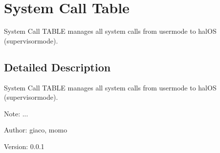 \hypertarget{group___s_y_s_t_e_m___c_a_l_l___t_a_b_l_e}{
\section{System Call Table}
\label{group___s_y_s_t_e_m___c_a_l_l___t_a_b_l_e}
}
System Call TABLE manages all system calls from usermode to halOS (supervisormode).  




\subsection{Detailed Description}
System Call TABLE manages all system calls from usermode to halOS (supervisormode). 

\begin{Desc}
\item[Note:]... \end{Desc}
\begin{Desc}
\item[Author:]giaco, momo \end{Desc}
\begin{Desc}
\item[Version:]0.0.1 \end{Desc}
